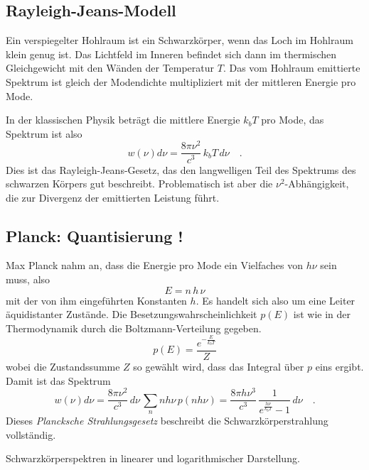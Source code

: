 \subsection{Rayleigh-Jeans-Modell}

Ein verspiegelter Hohlraum ist ein Schwarzkörper, wenn das Loch im Hohlraum klein genug ist. Das Lichtfeld im Inneren befindet sich dann im thermischen Gleichgewicht mit den Wänden der Temperatur $T$. Das vom Hohlraum emittierte Spektrum ist gleich der Modendichte multipliziert mit der mittleren Energie pro Mode.

In der klassischen Physik beträgt die mittlere Energie $k_b T$ pro Mode, das Spektrum ist also 
\begin{equation}
    w(\nu) d\nu = \frac{8 \pi \nu^2}{c^3} \, k_b T \, d\nu \quad .
\end{equation}
Dies ist das Rayleigh-Jeans-Gesetz, das den langwelligen Teil des Spektrums des schwarzen Körpers gut beschreibt. Problematisch ist aber die $\nu^2$-Abhängigkeit, die zur Divergenz der emittierten Leistung führt.


\subsection{Planck: Quantisierung !}

Max Planck nahm an, dass die Energie pro Mode ein Vielfaches von $h \nu$ sein muss, also 
\begin{equation}
    E = n \, h \, \nu
\end{equation}
mit der von ihm eingeführten Konstanten $h$. Es handelt sich also um eine Leiter äquidistanter Zustände. Die Besetzungswahrscheinlichkeit $p(E)$ ist wie in der Thermodynamik durch die Boltzmann-Verteilung gegeben.
\begin{equation}
    p(E) = \frac{e^{- \frac{E}{k_b T}}}{Z}
\end{equation}
wobei die Zustandssumme $Z$ so gewählt wird, dass das Integral über $p$ eins ergibt. Damit ist das Spektrum 
 \begin{equation}
     w(\nu) d\nu = \frac{8 \pi \nu^2}{c^3} \, d\nu \, \sum_n n h \nu \, p(n h \nu)
    = \frac{8 \pi h \nu^3}{c^3} \, \frac{1}{e^{\frac{h \nu}{k_b T}} -1} \,d\nu  \quad .
 \end{equation}
Dieses \emph{Plancksche Strahlungsgesetz} beschreibt die Schwarzkörperstrahlung vollständig.

\begin{marginfigure}
    \caption{Schwarzkörperspektren in linearer und logarithmischer Darstellung.}
\end{marginfigure}

